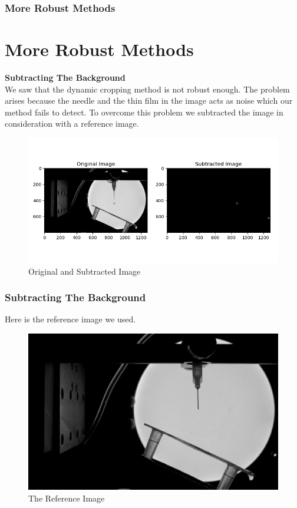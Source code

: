 \documentclass{beamer}
\begin{document}
\begin{frame}
    \frametitle{More Robust Methods}
    \section{More Robust Methods}
    \Large \textbf{Subtracting The Background}\\
    \small
    We saw that the dynamic cropping method is not robust enough. The problem arises because the needle and the thin film in the image acts as noise which our method fails to detect. To overcome this problem we subtracted the image in consideration with a reference image.\\
    \begin{figure}
        \centering
        \includegraphics[scale=0.4]{subtracted.png}
        \caption[]{Original and Subtracted Image}
    \end{figure}
\end{frame}
\begin{frame}
    \frametitle{Subtracting The Background}
    Here is the reference image we used.\\
    \begin{figure}
        \centering
        \includegraphics[scale=4]{ref_image.jpg}
        \caption[]{The Reference Image}
    \end{figure}
\end{frame}
\end{document}
